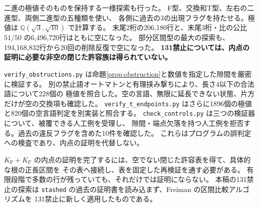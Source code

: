 \documentclass[10pt,a4paper]{article}
\newcommand{\KF}{K_{\mathrm F}}
\begin{document}
二進の極値そのものを保持する一様探索も行った。
F型、交換和T型、左右の二進型、両側二進型の五種類を使い、
各側に過去の3の出現フラグを持たせる。極値は $\mathbb Q(\sqrt3,\sqrt{10})$ で計算する。
末尾2桁の206,180行と、末尾3桁・比の公比 $51/50$ の6,496,720行はともに空になった。
部分区間型の最大の探索も、194,168,832行から20回の削除反復で空になった。
\textbf{131禁止については、内点の証明に必要な非空の閉じた許容族は得られていない。}

\texttt{verify\_obstructions.py} は命題\ref{prop:obstruction}と数値を指定した隙間を厳密に検証する。
別の禁止語オートマトンと有理挟み撃ちにより、長さ4以下の合法語について228個の
極値を照合した。空の言語、無限に延長できない状態、片方だけが空の交換項も確認した。
\texttt{verify\_t\_endpoints.py} はさらに1896個の極値と820個の空言語判定を別実装と照合する。
\texttt{check\_controls.py} は三つの検証器について、被覆できる人工例を受理し、
隙間・端点欠落を持つ人工例を拒否する。過去の違反フラグを含めた10件を確認した。
これらはプログラムの誤判定への検査であり、内点の証明を代替しない。

$\KF+\KF$ の内点の証明を完了するには、空でない閉じた許容表を得て、具体的な根の正長区間を
その表へ接続し、表を固定した再検証を通す必要がある。
有限段階で多数の行が残っていても、それだけでは証明にならない。
本稿の131禁止の探索は \texttt{stashed} の過去の証明書を読み込まず、Freiman の区間比較アルゴリズムを
131禁止に新しく適用したものである。
\end{document}
